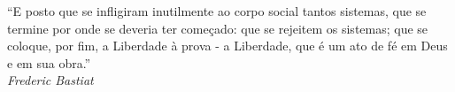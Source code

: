 \begin{titlepage}
 \vspace*{5cm}
 \begin{flushright}
  ``E posto que se infligiram inutilmente ao corpo social tantos sistemas,
    que se termine por onde se deveria ter começado: que se rejeitem os
    sistemas; que se coloque, por fim, a Liberdade à prova - a Liberdade,
    que é um ato de fé em Deus e em sua obra.''\\\textit{Frederic Bastiat}
  \vspace{1cm}
 \end{flushright}
\end{titlepage}

